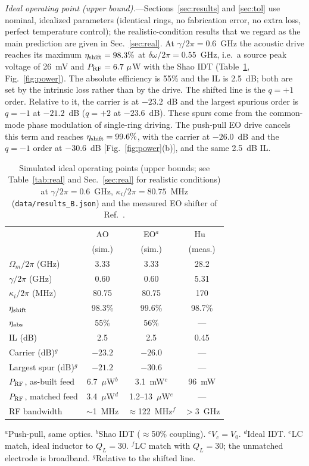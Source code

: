 \documentclass[aps,prapplied,reprint,superscriptaddress,amsmath,amssymb,floatfix]{revtex4-2}
\newcommand{\etash}{\eta_{\rm shift}}
\newcommand{\etaabs}{\eta_{\rm abs}}
\newcommand{\Pg}{P_{\rm RF}}
\begin{document}
\emph{Ideal operating point (upper bound).}---Sections~\ref{sec:results} and \ref{sec:tol} use nominal, idealized parameters (identical rings, no fabrication error, no extra loss, perfect temperature control); the realistic-condition results that we regard as the main prediction are given in Sec.~\ref{sec:real}. At $\gamma/2\pi=0.6$~GHz the acoustic drive reaches its maximum $\etash=98.3\%$ at $\delta\omega/2\pi=0.55$~GHz, i.e.\ a source peak voltage of 26~mV and $\Pg=6.7~\mu$W with the Shao IDT (Table~\ref{tab:main}, Fig.~\ref{fig:power}). The absolute efficiency is 55\% and the IL is 2.5~dB; both are set by the intrinsic loss rather than by the drive. The shifted line is the $q=+1$ order. Relative to it, the carrier is at $-23.2$~dB and the largest spurious order is $q=-1$ at $-21.2$~dB ($q=+2$ at $-23.6$~dB). These spurs come from the common-mode phase modulation of single-ring driving. The push-pull EO drive cancels this term and reaches $\etash=99.6\%$, with the carrier at $-26.0$~dB and the $q=-1$ order at $-30.6$~dB [Fig.~\ref{fig:power}(b)], and the same 2.5~dB IL.

\begin{table}[b]
\caption{Simulated ideal operating points (upper bounds; see Table~\ref{tab:real} and Sec.~\ref{sec:real} for realistic conditions) at $\gamma/2\pi=0.6$~GHz, $\kappa_i/2\pi=80.75$~MHz (\texttt{data/results\_B.json}) and the measured EO shifter of Ref.~\cite{Hu2021}.}
\label{tab:main}
\begin{ruledtabular}
\small
\begin{tabular}{lccc}
 & AO & EO$^{a}$ & Hu~\cite{Hu2021}\\
 & (sim.) & (sim.) & (meas.)\\
\hline
$\Omega_m/2\pi$ (GHz) & 3.33 & 3.33 & 28.2\\
$\gamma/2\pi$ (GHz) & 0.60 & 0.60 & 5.31\\
$\kappa_i/2\pi$ (MHz) & 80.75 & 80.75 & 170\\
$\etash$ & 98.3\% & 99.6\% & 98.7\%\\
$\etaabs$ & 55\% & 56\% & ---\\
IL (dB) & 2.5 & 2.5 & 0.45\\
Carrier (dB)$^{g}$ & $-23.2$ & $-26.0$ & ---\\
Largest spur (dB)$^{g}$ & $-21.2$ & $-30.6$ & ---\\
$\Pg$, as-built feed & 6.7~$\mu$W$^{b}$ & 3.1~mW$^{c}$ & 96~mW\\
$\Pg$, matched feed & 3.4~$\mu$W$^{d}$ & 1.2--13~$\mu$W$^{e}$ & ---\\
RF bandwidth & $\sim$1~MHz & $\approx$122~MHz$^{f}$ & $>$3~GHz\\
\end{tabular}
\end{ruledtabular}
\raggedright\footnotesize $^{a}$Push-pull, same optics. $^{b}$Shao IDT ($\approx$50\% coupling). $^{c}$$V_c=V_0$. $^{d}$Ideal IDT. $^{e}$LC match, ideal inductor to $Q_L=30$. $^{f}$LC match with $Q_L=30$; the unmatched electrode is broadband. $^{g}$Relative to the shifted line.
\end{table}
\end{document}
